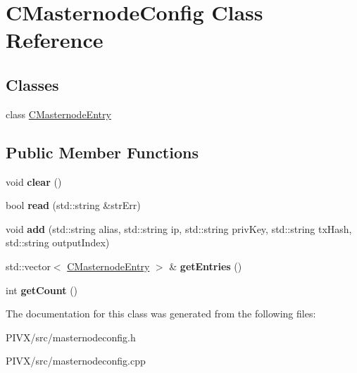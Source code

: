 \hypertarget{class_c_masternode_config}{}\section{C\+Masternode\+Config Class Reference}
\label{class_c_masternode_config}
\subsection*{Classes}
\begin{DoxyCompactItemize}
\item 
class \mbox{\hyperlink{class_c_masternode_config_1_1_c_masternode_entry}{C\+Masternode\+Entry}}
\end{DoxyCompactItemize}
\subsection*{Public Member Functions}
\begin{DoxyCompactItemize}
\item 
\mbox{\label{class_c_masternode_config_af6dab86b7e6b5bf0df9392fc7daedc3f}} 
void {\bfseries clear} ()
\item 
\mbox{\label{class_c_masternode_config_a028d769bc39a23177cf81a3e433b6e86}} 
bool {\bfseries read} (std\+::string \&str\+Err)
\item 
\mbox{\label{class_c_masternode_config_a578068fd91293257e3f302c002c6ba43}} 
void {\bfseries add} (std\+::string alias, std\+::string ip, std\+::string priv\+Key, std\+::string tx\+Hash, std\+::string output\+Index)
\item 
\mbox{\label{class_c_masternode_config_a21fb5f410e3dcd55429f256d4efe4e61}} 
std\+::vector$<$ \mbox{\hyperlink{class_c_masternode_config_1_1_c_masternode_entry}{C\+Masternode\+Entry}} $>$ \& {\bfseries get\+Entries} ()
\item 
\mbox{\label{class_c_masternode_config_ab67434f7d279d4837f4999f10265cd2f}} 
int {\bfseries get\+Count} ()
\end{DoxyCompactItemize}


The documentation for this class was generated from the following files\+:\begin{DoxyCompactItemize}
\item 
P\+I\+V\+X/src/masternodeconfig.\+h\item 
P\+I\+V\+X/src/masternodeconfig.\+cpp\end{DoxyCompactItemize}
